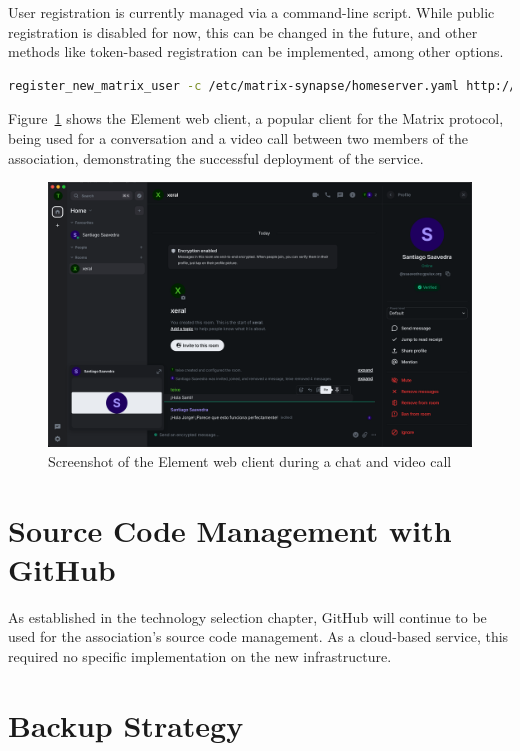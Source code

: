 User registration is currently managed via a command-line script. While public registration is disabled for now, this can be changed in the future, and other methods like token-based registration can be implemented, among other options.

\begin{lstlisting}[language=bash,caption={Command used to register a new Matrix user}]
register_new_matrix_user -c /etc/matrix-synapse/homeserver.yaml http://localhost:8008
\end{lstlisting}

Figure~\ref{fig:element-example} shows the Element web client, a popular client for the Matrix protocol, being used for a conversation and a video call between two members of the association, demonstrating the successful deployment of the service.

\begin{figure}[H]
	\centering
	\includegraphics[width=\textwidth]{imaxes/element-example.png}
       \caption{Screenshot of the Element web client during a chat and video call}
	\label{fig:element-example}
\end{figure}

\section{Source Code Management with GitHub}

As established in the technology selection chapter, GitHub will continue to be used for the association's source code management. As a cloud-based service, this required no specific implementation on the new infrastructure.

\section{Backup Strategy}

